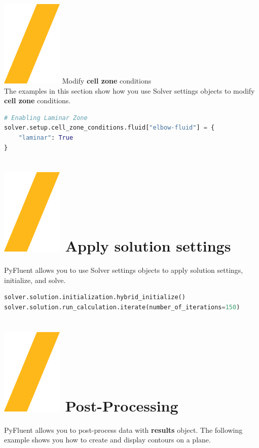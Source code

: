 \documentclass[9pt,landscape]{article}
\begin{document}
\begin{multicols}{3}
{\vfill
{\includegraphics[height=\fontcharht\font`\S]{slash.png}  Modify \textbf{cell zone} conditions} \\
The examples in this section show how you use Solver settings objects to modify \textbf{cell zone} conditions.
\begin{lstlisting}[language=Python]
# Enabling Laminar Zone  
solver.setup.cell_zone_conditions.fluid["elbow-fluid"] = {
    "laminar": True
}
\end{lstlisting}
\vfill

\vfill
\section{\includegraphics[height=\fontcharht\font`\S]{slash.png}  Apply solution settings}
PyFluent allows you to use Solver settings objects to apply
solution settings, initialize, and solve.

\begin{lstlisting}[language=Python]
solver.solution.initialization.hybrid_initialize()
solver.solution.run_calculation.iterate(number_of_iterations=150)
\end{lstlisting}

\section{\includegraphics[height=\fontcharht\font`\S]{slash.png}  Post-Processing}
PyFluent allows you to post-process data with \textbf{results} object. The following example shows you how to create and display contours on a plane.

}
\end{multicols}
\end{document}
